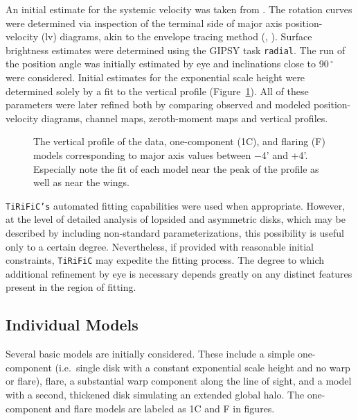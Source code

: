 \documentclass{emulateapj}
\begin{document}
\par
   An initial estimate for the systemic velocity was taken from \citet{1991AJ....102...48R}.  The rotation curves were determined via inspection of the terminal side of major axis position-velocity (lv) diagrams, akin to the envelope tracing method (\citealt{1979A&A....74...73S}, \citealt{2001ARA&A..39..137S}).  Surface brightness estimates were determined using the GIPSY task {\tt radial}.  The run of the position angle was initially estimated by eye and inclinations close to 90$\,^{\circ}$ were considered.  Initial estimates for the exponential scale height were determined solely by a fit to the vertical profile (Figure~\ref{fig5}).  All of these parameters were later refined both by comparing observed and modeled position-velocity diagrams, channel maps, zeroth-moment maps and vertical profiles.


\begin{figure}
\caption{The vertical profile of the data, one-component (1C), and flaring (F) models corresponding to major axis values between $-$4' and +4'.  Especially note the fit of each model near the peak of the profile as well as near the wings.  \label{fig5}}
\end{figure}

 

\par
    {\tt TiRiFiC's} automated fitting capabilities were used when appropriate. However, at the level of detailed analysis of lopsided and asymmetric disks, which may be described by including non-standard parameterizations, this possibility is useful only to a certain degree. Nevertheless, if provided with reasonable initial constraints, {\tt TiRiFiC} may expedite the fitting process.  The degree to which additional refinement by eye is necessary depends greatly on any distinct features present in the region of fitting.


\subsection {Individual Models} \label{Section4.1}     

\par
    Several basic models are initially considered.  These include a simple one-component (i.e.\ single disk with a constant exponential scale height and no warp or flare), flare, a substantial warp component along the line of sight, and a model with a second, thickened disk simulating an extended global halo.  The one-component and flare models are labeled as 1C and F in figures. 
\end{document}
